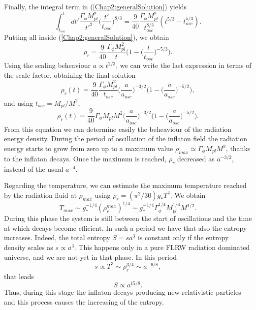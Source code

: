 \documentclass[11pt,a4paper,twoside]{book}
\begin{document}
Finally, the integral term in (\ref{Chap2:generalSolution}) yields
\begin{equation}
	\label{Chap2:IntegralTerm}
	\int_{t_{osc}}^{t} dt'\frac{\Gamma_{\phi} M_{pl}^{2}}{t'^{2}}\Big (\frac{t'}{t_{osc}}\Big)^{8/3} = \frac{9}{40}\frac{\Gamma_{\phi} M_{pl}^{2}}{t_{osc}^{8/3}}(t^{5/3} - t_{osc}^{5/3}).
\end{equation}
Putting all inside (\ref{Chap2:generalSolution}), we obtain
\begin{equation}
	\rho_{r}=\frac{9}{40}\frac{\Gamma_{\phi}M_{pl}^{2}}{t}\Big (1- \Big (\frac{t}{t_{osc}}\Big)^{-5/3}\Big).
\end{equation}
Using the scaling beheaviour $ a \propto t^{2/3} $, we can write the last expression in terms of the scale factor, obtaining the final solution
\begin{equation}
\label{Chap2:finalSolution}
\rho_{r}(t)=\frac{9}{40}\frac{\Gamma_{\phi}M_{pl}^{2}}{t_{osc}}\Big (\frac{a}{a_{osc}}\Big)^{-3/2}\Big (1- \Big (\frac{a}{a_{osc}}\Big)^{-5/2}\Big),
\end{equation}
and using $ t_{osc}=M_{pl}/M^{2} $,
\begin{equation}
	\rho_{r}(t)=\frac{9}{40}\Gamma_{\phi}M_{pl}M^{2}\Big (\frac{a}{a_{osc}}\Big)^{-3/2}\Big (1- \Big (\frac{a}{a_{osc}}\Big)^{-5/2}\Big).
\end{equation}
From this equation we can determine easily the beheaviour of the radiation energy density. During the period of oscillation of the inflaton field the radiation energy starts to grow from zero up to a maximum value $\rho_{max} \simeq \Gamma_{\phi} M_{pl} M^{2}$, thanks to the inflaton decays. Once the maximum is reached, $\rho_{r}$ decreased as $ a^{-3/2} $, instead of the usual $ a^{-4} $.

Regarding the temperature, we can estimate the maximum temperature reached by the radiation fluid at $\rho_{max}$ using $ \rho_{r}=(\pi^{2}/30)g_{*}T^{4} $. We obtain 
\begin{equation}
	T_{max} \sim g_{*}^{-1/4}(\rho_{r}^{max})^{1/4} \sim g_{*}^{-1/4}\Gamma_{\phi}^{1/4}M_{pl}^{1/4}M^{1/2}.
\end{equation}
During this phase the system  is still between the start of oscillations and the time at which decays become efficient. In such a period we have that also the entropy increases. Indeed, the total entropy $ S = sa^{3} $ is constant only if the entropy density scales as $ s \propto a^{3} $. This happens only in a pure FLRW radiation dominated universe, and we are not yet in that phase.
In this period 
\begin{equation}
\label{Chap2:entropy}
s \propto T^{3} \sim \rho_{r}^{3/4} \sim a^{-9/8},
\end{equation}
that leads
\begin{equation}
	\label{Chap2:totalEntropy}
	S \propto a^{15/8}.
\end{equation}
Thus, during this stage the inflaton decays producing new relativistic particles and this process causes the increasing of the entropy.
\end{document}

